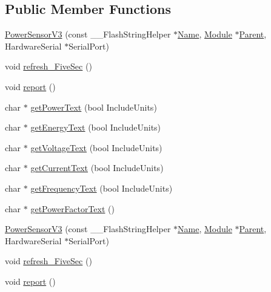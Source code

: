 \subsection*{Public Member Functions}
\begin{DoxyCompactItemize}
\item 
\hyperlink{class_power_sensor_v3_a254a0502c2a42a5ccff07147a8a6ccfc}{Power\+Sensor\+V3} (const \+\_\+\+\_\+\+Flash\+String\+Helper $\ast$\hyperlink{class_common_aeea91a726dbe988e515057b32ba0726f}{Name}, \hyperlink{class_module}{Module} $\ast$\hyperlink{class_power_sensor_v3_aa7a23932f754042ad07e654a408e8a52}{Parent}, Hardware\+Serial $\ast$Serial\+Port)
\item 
void \hyperlink{class_power_sensor_v3_a1bf23a2cfa924933a5e265dc3a337ec4}{refresh\+\_\+\+Five\+Sec} ()
\item 
void \hyperlink{class_power_sensor_v3_ab86f05622f809b34c4af5587024377d1}{report} ()
\item 
char $\ast$ \hyperlink{class_power_sensor_v3_a17c2031435f3ada2c531c41cdf58c629}{get\+Power\+Text} (bool Include\+Units)
\item 
char $\ast$ \hyperlink{class_power_sensor_v3_a63517e9f76afef5ee7da103cc46abc84}{get\+Energy\+Text} (bool Include\+Units)
\item 
char $\ast$ \hyperlink{class_power_sensor_v3_a506c7292897607d7dd31d3ff3696806a}{get\+Voltage\+Text} (bool Include\+Units)
\item 
char $\ast$ \hyperlink{class_power_sensor_v3_afae9ea1a12d8b7fc3eb012b1c38d0639}{get\+Current\+Text} (bool Include\+Units)
\item 
char $\ast$ \hyperlink{class_power_sensor_v3_adc5ce409d7bf0b6dac4d65fa64619bdb}{get\+Frequency\+Text} (bool Include\+Units)
\item 
char $\ast$ \hyperlink{class_power_sensor_v3_a0799057ba96ffc74b372b88d94874d33}{get\+Power\+Factor\+Text} ()
\item 
\hyperlink{class_power_sensor_v3_a254a0502c2a42a5ccff07147a8a6ccfc}{Power\+Sensor\+V3} (const \+\_\+\+\_\+\+Flash\+String\+Helper $\ast$\hyperlink{class_common_aeea91a726dbe988e515057b32ba0726f}{Name}, \hyperlink{class_module}{Module} $\ast$\hyperlink{class_power_sensor_v3_aa7a23932f754042ad07e654a408e8a52}{Parent}, Hardware\+Serial $\ast$Serial\+Port)
\item 
void \hyperlink{class_power_sensor_v3_a1bf23a2cfa924933a5e265dc3a337ec4}{refresh\+\_\+\+Five\+Sec} ()
\item 
void \hyperlink{class_power_sensor_v3_ab86f05622f809b34c4af5587024377d1}{report} ()

\end{DoxyCompactItemize}
